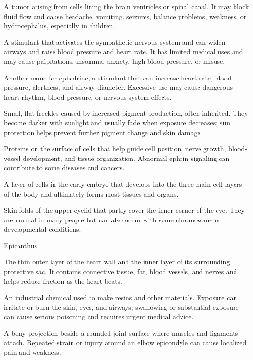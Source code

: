  A tumor arising from cells lining the brain ventricles or spinal canal. It may block fluid flow and cause headache, vomiting, seizures, balance problems, weakness, or hydrocephalus, especially in children.

 A stimulant that activates the sympathetic nervous system and can widen airways and raise blood pressure and heart rate. It has limited medical uses and may cause palpitations, insomnia, anxiety, high blood pressure, or misuse.

 Another name for ephedrine, a stimulant that can increase heart rate, blood pressure, alertness, and airway diameter. Excessive use may cause dangerous heart-rhythm, blood-pressure, or nervous-system effects.

 Small, flat freckles caused by increased pigment production, often inherited. They become darker with sunlight and usually fade when exposure decreases; sun protection helps prevent further pigment change and skin damage.

 Proteins on the surface of cells that help guide cell position, nerve growth, blood-vessel development, and tissue organization. Abnormal ephrin signaling can contribute to some diseases and cancers.

 A layer of cells in the early embryo that develops into the three main cell layers of the body and ultimately forms most tissues and organs.

 Skin folds of the upper eyelid that partly cover the inner corner of the eye. They are normal in many people but can also occur with some chromosome or developmental conditions.

\synonyms
Epicanthus

 The thin outer layer of the heart wall and the inner layer of its surrounding protective sac. It contains connective tissue, fat, blood vessels, and nerves and helps reduce friction as the heart beats.

 An industrial chemical used to make resins and other materials. Exposure can irritate or burn the skin, eyes, and airways; swallowing or substantial exposure can cause serious poisoning and requires urgent medical advice.

 A bony projection beside a rounded joint surface where muscles and ligaments attach. Repeated strain or injury around an elbow epicondyle can cause localized pain and weakness.

